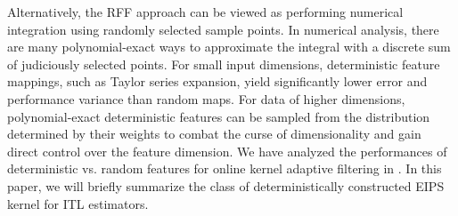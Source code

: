 \documentclass[8pt,twocolumn]{IEEEtran}
\begin{document}
Alternatively, the RFF approach can be viewed as performing numerical integration using randomly selected sample points. In numerical analysis, there are many polynomial-exact ways to approximate the integral with a discrete sum of judiciously selected points. For small input dimensions, deterministic feature mappings, such as Taylor series expansion, yield significantly lower error and performance variance than random maps. For data of higher dimensions, polynomial-exact deterministic features can be sampled from the distribution determined by their weights to combat the curse of dimensionality and gain direct control over the feature dimension. We have analyzed the performances of deterministic vs. random features for online kernel adaptive filtering in \cite{Li2019notrick}. In this paper, we will briefly summarize the class of deterministically constructed EIPS kernel for ITL estimators.
\end{document}
